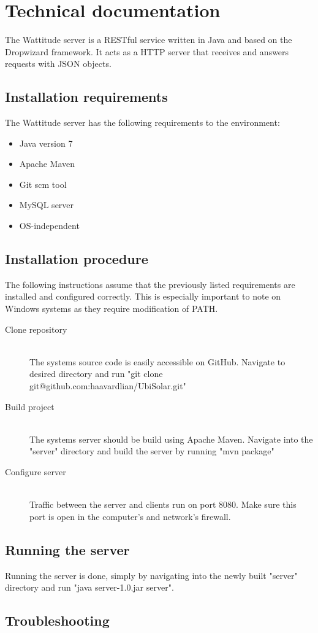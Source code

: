 \chapter{Technical documentation}
The Wattitude server is a RESTful service written in Java and based on the Dropwizard framework. It acts as a HTTP server that receives and answers requests with JSON objects. 
\section{Installation requirements}
The Wattitude server has the following requirements to the environment:
\begin{itemize}
\item Java version 7
\item Apache Maven 
\item Git scm tool
\item MySQL server
\item OS-independent
\end{itemize}
\section{Installation procedure}
The following instructions assume that the previously listed requirements are installed and configured correctly. This is especially important to note on Windows systems as they require modification of PATH.
\begin{description}
  \item[Clone repository] \hfill \\
  The systems source code is easily accessible on GitHub. Navigate to desired directory and run "git clone git@github.com:haavardlian/UbiSolar.git"
  \item[Build project] \hfill \\
  The systems server should be build using Apache Maven. Navigate into the "server" directory and build the server by running "mvn package"
  \item[Configure server] \hfill \\
  Traffic between the server and clients run on port 8080. Make sure this port is open in the computer's and network's firewall. 
  
\end{description}

\section{Running the server}
Running the server is done, simply by navigating into the newly built "server" directory and run "java server-1.0.jar server".

\section{Troubleshooting}